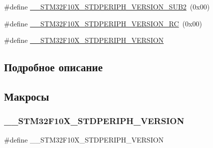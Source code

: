 \begin{DoxyCompactItemize}
\item 
\#define \mbox{\hyperlink{group___library__configuration__section_ga3ec41777ab08436b801c9c295248a6c7}{\+\_\+\+\_\+\+S\+T\+M32\+F10\+X\+\_\+\+S\+T\+D\+P\+E\+R\+I\+P\+H\+\_\+\+V\+E\+R\+S\+I\+O\+N\+\_\+\+S\+U\+B2}}~(0x00)
\item 
\#define \mbox{\hyperlink{group___library__configuration__section_gae0abedef178fde6294fdfd3401ef6e2c}{\+\_\+\+\_\+\+S\+T\+M32\+F10\+X\+\_\+\+S\+T\+D\+P\+E\+R\+I\+P\+H\+\_\+\+V\+E\+R\+S\+I\+O\+N\+\_\+\+RC}}~(0x00)
\item 
\#define \mbox{\hyperlink{group___library__configuration__section_gafb19c8675ea01accc2f8e5f467827328}{\+\_\+\+\_\+\+S\+T\+M32\+F10\+X\+\_\+\+S\+T\+D\+P\+E\+R\+I\+P\+H\+\_\+\+V\+E\+R\+S\+I\+ON}}
\end{DoxyCompactItemize}


\subsection{Подробное описание}


\subsection{Макросы}
\mbox{\label{group___library__configuration__section_gafb19c8675ea01accc2f8e5f467827328}} 
\subsubsection{\texorpdfstring{\_\_STM32F10X\_STDPERIPH\_VERSION}{\_\_STM32F10X\_STDPERIPH\_VERSION}}
{\footnotesize\ttfamily \#define \+\_\+\+\_\+\+S\+T\+M32\+F10\+X\+\_\+\+S\+T\+D\+P\+E\+R\+I\+P\+H\+\_\+\+V\+E\+R\+S\+I\+ON}

